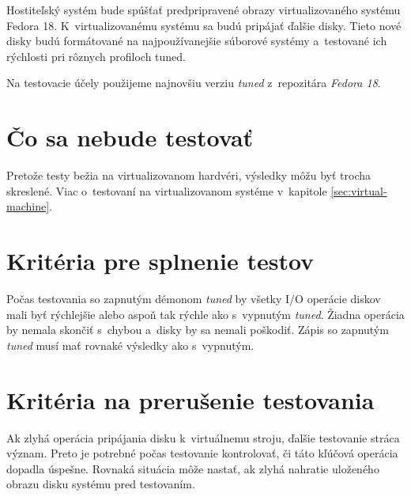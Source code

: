 Hostiteľský systém bude spúšťať predpripravené obrazy virtualizovaného systému
Fedora 18. K~virtualizovanému systému sa budú pripájať ďalšie disky. Tieto nové
disky budú formátované na najpoužívanejšie súborové systémy a~testované ich
rýchlosti pri rôznych profiloch tuned.

Na testovacie účely použijeme najnovšiu verziu \emph{tuned} z~repozitára \emph{Fedora 18}.

\section{Čo sa nebude testovať}

Pretože testy bežia na virtualizovanom hardvéri, výsledky môžu byť trocha
skreslené. Viac o~testovaní na virtualizovanom systéme v~kapitole
\ref{sec:virtual-machine}.


\section{Kritéria pre splnenie testov}

Počas testovania so zapnutým démonom \emph{tuned} by všetky I/O operácie diskov
mali byť rýchlejšie alebo aspoň tak rýchle ako s~vypnutým \emph{tuned}. Žiadna
operácia by nemala skončiť s~chybou a~disky by sa nemali poškodiť. Zápis so
zapnutým \emph{tuned} musí mať rovnaké výsledky ako s~vypnutým.

\section{Kritéria na prerušenie testovania}

Ak zlyhá operácia pripájania disku k~virtuálnemu stroju, ďalšie testovanie
stráca význam. Preto je potrebné počas testovanie kontrolovať, či táto kľúčová
operácia dopadla úspešne. Rovnaká situácia môže nastať, ak zlyhá nahratie
uloženého obrazu disku systému pred testovaním.

